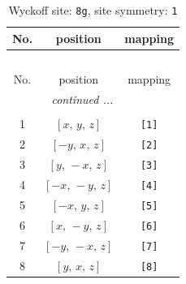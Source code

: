 \documentclass[fleqn,8pt]{jsarticle}
\begin{document}
\renewcommand{\arraystretch}{1.2}
\begin{longtable}{ccc}
\caption{Wyckoff site: {\tt 8g}, site symmetry: {\tt 1}}
 \\
 \hline \hline
No. & position & mapping \\ \hline \endfirsthead

\multicolumn{2}{l}{\tablename\ \thetable{}} \\
 \hline \hline
No. & position & mapping \\ \hline \endhead

 \hline \hline
\multicolumn{2}{r}{\footnotesize\it continued ...} \\ \endfoot

 \hline \hline
\multicolumn{2}{r}{} \\ \endlastfoot

1 & $\left[ x,\, y,\, z \right]$ & {\tt [1]} \\ \hline
2 & $\left[ - y,\, x,\, z \right]$ & {\tt [2]} \\ \hline
3 & $\left[ y,\, - x,\, z \right]$ & {\tt [3]} \\ \hline
4 & $\left[ - x,\, - y,\, z \right]$ & {\tt [4]} \\ \hline
5 & $\left[ - x,\, y,\, z \right]$ & {\tt [5]} \\ \hline
6 & $\left[ x,\, - y,\, z \right]$ & {\tt [6]} \\ \hline
7 & $\left[ - y,\, - x,\, z \right]$ & {\tt [7]} \\ \hline
8 & $\left[ y,\, x,\, z \right]$ & {\tt [8]} \\
\end{longtable}
\end{document}
